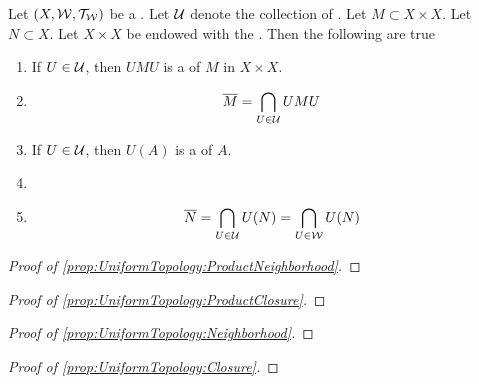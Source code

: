 \begin{prop}
\label{prop:UniformProductTopology}
Let $(X,\mathcal{W}, \mathcal{T}_{\mathcal{W}})$ be a \UniformSpace. 
Let $\mathcal{U}$ denote the collection of \SymmetricRelation \Entourages.
Let $M \subset X \times X$. 
Let $N \subset X$. 
Let $X \times X$ be endowed with the \ProductTopology.
Then the following are true
\begin{enumerate}[label=(\roman*), ref={\ref{prop:UniformProductTopology}~\roman*}]
\item 
\label{prop:UniformTopology:ProductNeighborhood} 
If $U \in \mathcal{U}$, 
then $UMU$ is a \Neighborhood of $M$ in $X \times X$. 
\item \label{prop:UniformTopology:ProductClosure} 
\begin{equation*}
\overline{M} = \bigcap_{U \in \mathcal{U}} U M U
\end{equation*}
\item 
\label{prop:UniformTopology:Neighborhood} 
If $U \in \mathcal{U}$, then $U(A)$ is a \Neighborhood of $A$.
\item 
\item \label{prop:UniformTopology:Closure} 
\begin{equation*}
\overline{N}=\bigcap\limits_{U \in \mathcal{U}} U(N) = \bigcap\limits_{U \in \mathcal{W}} U(N)
\end{equation*}
\end{enumerate}
\begin{proof}[Proof of \ref{prop:UniformTopology:ProductNeighborhood}]
\end{proof}
\begin{proof}[Proof of \ref{prop:UniformTopology:ProductClosure}]
\end{proof}
\begin{proof}[Proof of \ref{prop:UniformTopology:Neighborhood}]
\end{proof}
\begin{proof}[Proof of \ref{prop:UniformTopology:Closure}]
\end{proof}
\end{prop}
